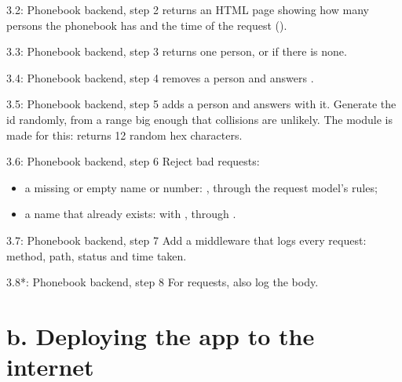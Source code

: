 \begin{exercise}{3.2: Phonebook backend, step 2}
 returns an HTML page showing how many persons the phonebook has and the time of the request ().
\end{exercise}

\begin{exercise}{3.3: Phonebook backend, step 3}
 returns one person, or  if there is none.
\end{exercise}

\begin{exercise}{3.4: Phonebook backend, step 4}
 removes a person and answers .
\end{exercise}

\begin{exercise}{3.5: Phonebook backend, step 5}
 adds a person and answers  with it. Generate the id randomly, from a range big enough that collisions are unlikely. The  module is made for this:  returns 12 random hex characters.
\end{exercise}

\begin{exercise}{3.6: Phonebook backend, step 6}
Reject bad requests:
\begin{itemize}
\item a missing or empty name or number: , through the request model's rules;
\item a name that already exists:  with , through .
\end{itemize}
\end{exercise}

\begin{exercise}{3.7: Phonebook backend, step 7}
Add a middleware that logs every request: method, path, status and time taken.
\end{exercise}

\begin{exercise}{3.8*: Phonebook backend, step 8}
For  requests, also log the body.
\end{exercise}

\section{b. Deploying the app to the internet}

